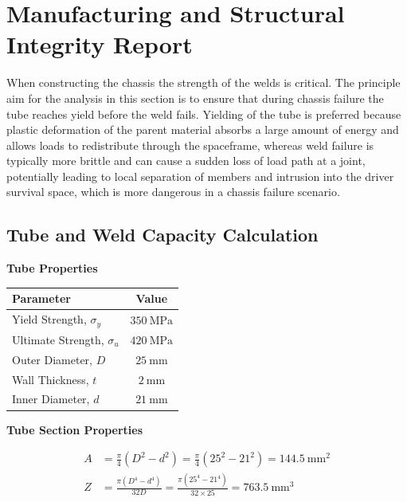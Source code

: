 \section{Manufacturing and Structural Integrity Report}

When constructing the chassis the strength of the welds is critical. The principle aim for the analysis in this section is to ensure that during chassis failure the tube reaches yield before the weld fails. Yielding of the tube is preferred because plastic deformation of the parent material absorbs a large amount of energy and allows loads to redistribute through the spaceframe, whereas weld failure is typically more brittle and can cause a sudden loss of load path at a joint, potentially leading to local separation of members and intrusion into the driver survival space, which is more dangerous in a chassis failure scenario.

\subsection{Tube and Weld Capacity Calculation}

\noindent\textbf{Tube Properties}\par
\vspace{4pt}
\begin{table}[h]
    \centering
    \begin{tabular}{|l|c|}
        \hline
        Parameter & Value \\
        \hline
        Yield Strength, $\sigma_y$ & $350\ \text{MPa}$ \\
        Ultimate Strength, $\sigma_u$ & $420\ \text{MPa}$ \\
        Outer Diameter, $D$ & $25\ \text{mm}$ \\
        Wall Thickness, $t$ & $2\ \text{mm}$ \\
        Inner Diameter, $d$ & $21\ \text{mm}$ \\
        \hline
    \end{tabular}
\end{table}
\vspace{6pt}

\noindent\textbf{Tube Section Properties}\par
\vspace{4pt}
\begin{align*}
A &= \frac{\pi}{4}(D^2 - d^2)
= \frac{\pi}{4}(25^2 - 21^2)
= 144.5\ \text{mm}^2 \\
Z &= \frac{\pi (D^4 - d^4)}{32D}
= \frac{\pi (25^4 - 21^4)}{32 \times 25}
= 763.5\ \text{mm}^3
\end{align*}

